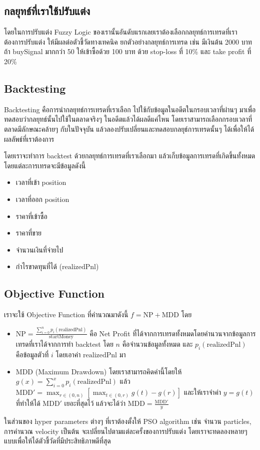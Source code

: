 \subsection{กลยุทธ์ที่เราใช้ปรับแต่ง}
โดยในการปรับแต่ง Fuzzy Logic ของเรานั้นอันดับแรกเลยเราต้องเลือกกลยุทธ์การเทรดที่เราต้องการปรับแต่ง ให้มีผลต่อตัวชี้วัดทางเทคนิค ยกตัวอย่างกลยุทธ์การเทรด
เช่น มีเงินต้น 2000 บาท ถ้า buySignal มากกว่า 50 ให้เข้าซื้อด้วย 100 บาท ด้วย stop-loss ที่ 10\% และ take profit ที่ 20\% 
\subsection{Backtesting}
Backtesting คือการนำกลยุทธ์การเทรดที่เราเลือก ไปใช้กับข้อมูลในอดีตในกรอบเวลาที่ผ่านๆ มาเพื่อทดสอบว่ากลยุทธ์นั้นไปใช้ในตลาดจริงๆ ในอดีตแล้วได้ผลดีแค่ไหน
โดยเราสามารถเลือกกรอบเวลาที่ตลาดมีลักษณะคล้ายๆ กับในปัจจุบัน แล้วลองปรับเปลี่ยนและทดสอบกลยุธ์การเทรดนั้นๆ ได้เพื่อให้ได้ผลลัพธ์ที่เราต้องการ

โดยเราจะทำการ backtest ด้วยกลยุทธ์การเทรดที่เราเลือกมา แล้วเก็บข้อมูลการเทรดที่เกิดขึ้นทั้งหมดโดยแต่ละการเทรดจะมีข้อมูลดังนี้ 
\begin{itemize}
    \item เวลาที่เข้า position
    \item เวลาที่ออก position
    \item ราคาที่เข้าซื้อ
    \item ราคาที่ขาย
    \item จำนวนเงินที่จ่ายไป
    \item กำไรขาดทุนที่ได้ ($\text{realizedPnl}$)
\end{itemize}

\subsection{Objective Function}
เราจะใช้ Objective Function ที่คำนวณมาดังนี้ $f = \text{NP} + \text{MDD}$ โดย
\begin{itemize}
    \item {$\text{NP} = \frac{\sum_{i=0}^{n} p_i(\text{realizedPnl})}{\text{startMoney}}$ 
        คือ Net Profit ที่ได้จากการเทรดทั้งหมดโดยคำนวนจากข้อมูลการเทรดที่เราได้จากการทำ backtest โดย $n$ คือจำนวนข้อมูลทั้งหมด
        และ $p_i(\text{realizedPnl})$ คือข้อมูลตัวที่ $i$ โดยเอาค่า $\text{realizedPnl}$ มา 
    }
    \item {$\text{MDD}$ (Maximum Drawdown) โดยเราสามารถคิดค่านี้โดยให้ $g(x) = \sum_{i = 0}^{x}p_i(\text{realizedPnl})$ 
    แล้ว $\text{MDD}' = \max_{r \in (0, n)} \left[ \max_{t \in (0, r)} g(t) - g(r) \right]$ และให้เราจำค่า $y = g(t)$ ที่ทำให้ได้ 
    $\text{MDD}'$ เยอะที่สุดไว้ แล้วจะได้ว่า $\text{MDD} = \frac{\text{MDD}'}{y}$
    }
\end{itemize}
ในส่วนของ hyper parameters ต่างๆ ที่เราต้องตั้งให้ PSO algorithm เช่น จำนวน particles, การคำนวณ velocity เป็นต้น จะเปลี่ยนไปตามแต่ละครั้งของการปรับแต่ง 
โดยเราจะทดลองหลายๆ แบบเพื่อให้ได้ตัวชี้วัดที่มีประสิทธิภาพดีที่สุด

